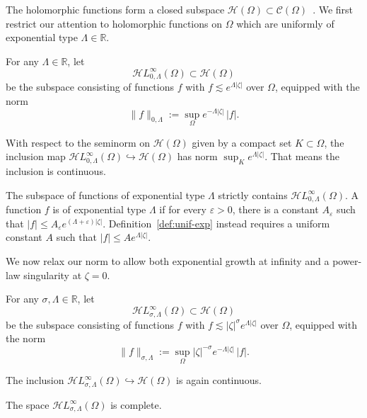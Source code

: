 \documentclass[review]{siamart220329}
\newcommand{\R}{\mathbb{R}}
\newcommand{\cont}{\mathcal{C}}
\newcommand{\holo}{\mathcal{H}}
\newcommand{\singexp}[2]{\mathcal{H}L^\infty_{#1, #2}}
\newcommand{\domain}{\Omega}
\begin{document}
The holomorphic functions form a closed subspace $\holo(\domain) \subset \cont(\domain)$~\cite[Proposition~3.14]{fnl-cpx-anal}. \color{blue}We first restrict our attention to holomorphic functions on $\domain$ which are uniformly of exponential type $\Lambda \in \R$.
\begin{definition}\label{def:unif-exp}
For any $\Lambda \in \R$, let
\[ \singexp{0}{\Lambda}(\domain) \subset \holo(\domain) \]
be the subspace consisting of functions $f$ with $f \lesssim e^{\Lambda|\zeta|}$ over $\domain$, equipped with the norm
\[ \|f\|_{0, \Lambda} := \sup_\Omega e^{-\Lambda|\zeta|}\,|f|. \]
\end{definition}
With respect to the seminorm on $\holo(\domain)$ given by a compact set $K \subset \domain$, the inclusion map $\singexp{0}{\Lambda}(\domain) \hookrightarrow \holo(\domain)$ has norm $\sup_K e^{\Lambda |\zeta|}$. That means the inclusion is continuous.
\begin{rmk}
The subspace of functions of exponential type $\Lambda$ strictly contains $\singexp{0}{\Lambda}(\domain)$. A function $f$ is of exponential type $\Lambda$ if for every $\varepsilon>0$, there is a constant $A_\varepsilon$ such that $|f|\le A_\varepsilon e^{(\Lambda+\varepsilon)|\zeta|}$. Definition~\ref{def:unif-exp} instead requires a uniform constant $A$ such that $|f| \le A e^{\Lambda|\zeta|}$.\end{rmk}
We now relax our norm to allow both exponential growth at infinity and a power-law singularity at $\zeta = 0$.
\begin{definition}
For any $\sigma, \Lambda \in \R$, let
\[ \singexp{\sigma}{\Lambda}(\domain) \subset \holo(\domain) \]
be the subspace consisting of functions $f$ with $f \lesssim |\zeta|^\sigma e^{\Lambda|\zeta|}$ over $\domain$, equipped with the norm
\[ \|f\|_{\sigma,\Lambda} := \sup_\Omega |\zeta|^{-\sigma} e^{-\Lambda|\zeta|}\,|f|. \]
\end{definition}
The inclusion $\singexp{\sigma}{\Lambda}(\domain) \hookrightarrow \holo(\domain)$ is again continuous.
\begin{proposition}\label{exp-complete}
The space $\singexp{\sigma}{\Lambda}(\domain)$ is complete.
\end{proposition}
\end{document}
